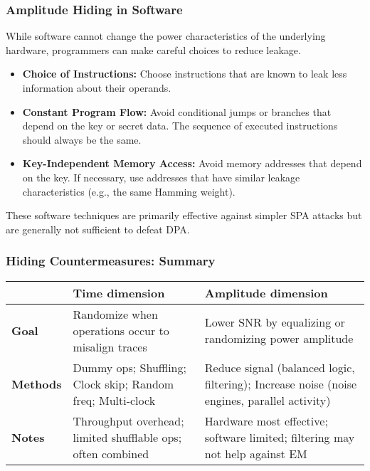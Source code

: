 \begin{frame}
    \frametitle{Amplitude Hiding in Software}

    While software cannot change the power characteristics of the underlying hardware, programmers can make careful choices to reduce leakage.

    \begin{itemize}
        \item \textbf{Choice of Instructions:} Choose instructions that are known to leak less information about their operands.
        
        \item \textbf{Constant Program Flow:} Avoid conditional jumps or branches that depend on the key or secret data. The sequence of executed instructions should always be the same.
        
        \item \textbf{Key-Independent Memory Access:} Avoid memory addresses that depend on the key. If necessary, use addresses that have similar leakage characteristics (e.g., the same Hamming weight).
    \end{itemize}
    
    These software techniques are primarily effective against simpler SPA attacks but are generally not sufficient to defeat DPA.

\end{frame}
\begin{frame}
  \frametitle{Hiding Countermeasures: Summary}
  \scriptsize
  \setlength{\tabcolsep}{4pt}\renewcommand{\arraystretch}{1.2}
  \begin{adjustbox}{\textwidth}
  \begin{tabularx}{\textwidth}{>{\bfseries}l >{\RaggedRight\arraybackslash}X >{\RaggedRight\arraybackslash}X}
    \toprule
     & Time dimension & Amplitude dimension \\
    \midrule
    Goal
      & Randomize when operations occur to misalign traces
      & Lower SNR by equalizing or randomizing power amplitude \\
    Methods
      & Dummy ops; Shuffling; Clock skip; Random freq; Multi-clock
      & Reduce signal (balanced logic, filtering); Increase noise (noise engines, parallel activity) \\
    Notes
      & Throughput overhead; limited shufflable ops; often combined
      & Hardware most effective; software limited; filtering may not help against EM \\
    \bottomrule
  \end{tabularx}
  \end{adjustbox}
\end{frame}







